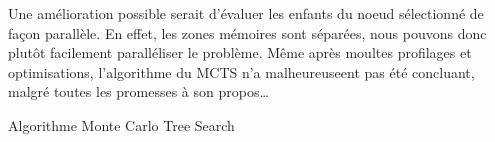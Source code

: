 Une amélioration possible serait d'évaluer les enfants du noeud sélectionné de façon parallèle.
En effet, les zones mémoires sont séparées, nous pouvons donc plutôt facilement paralléliser le problème.
Même après moultes profilages et optimisations, l'algorithme du MCTS n'a malheureuseent pas été concluant, malgré
toutes les promesses à son propos\dots

\begin{algorithm}
	\caption{Algorithme Monte Carlo Tree Search}
	\label{alg:mcts}
\end{algorithm}